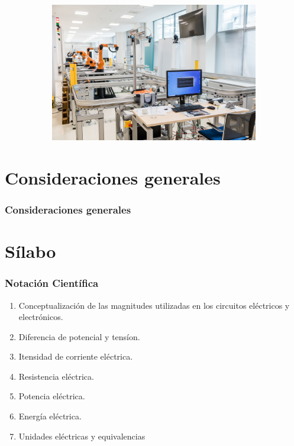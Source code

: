 \documentclass[xcolor=dvipsnames,envcountsect]{beamer}
\begin{document}
\begin{frame}
\begin{figure}
\begin{subfigure}[b]{0.3\textwidth}
     \end{subfigure}
     \vfill
     \begin{subfigure}[b]{0.2\textwidth}
         \centering
         \includegraphics[width=\textwidth]{Figures/ciirc.jpg}
     \end{subfigure}
\end{figure}
\end{frame}



\section{Consideraciones generales}
\begin{frame}
	\frametitle{Consideraciones generales}
		\justifying

\end{frame}






\section{ Sílabo}
\begin{frame}
	\frametitle{Notación Científica}
		\justifying
		\begin{enumerate}
		\item Conceptualización de las magnitudes utilizadas en los circuitos eléctricos y electrónicos.
		\item Diferencia de potencial y tensíon.
		\item Itensidad de corriente eléctrica.
		\item Resistencia eléctrica.
		\item Potencia eléctrica.
		\item Energía eléctrica.
		\item Unidades eléctricas y equivalencias
		\end{enumerate}
\end{frame}
\end{document}
